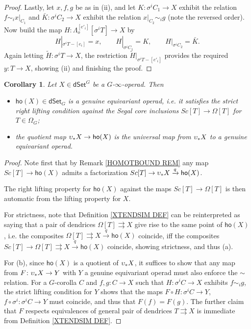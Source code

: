 \documentclass[a4paper,10pt
,draft
]{article}%
\numberwithin{equation}{section}
\numberwithin{figure}{section}
\newtheorem{corollary}[equation]{Corollary}%
\theoremstyle{definition} %
\newcommand{\1}{\ensuremath{\mathbbm 1}}%
\begin{document}
\begin{proof}
Lastly, let $x,f,g$ be as in (ii), 
and let
$K \colon \sigma^i C_1 \to X$ exhibit the relation
$f \sim_i x|_{C_1}$
and 
$ \bar{K} \colon \sigma^i C_2 \to X$
exhibit the relation
$x|_{C_2} \sim_i g$ (note the reversed order).
Now build the map
$H \colon \Lambda_o^{[e'_i]}[\sigma^i T] \to X$ by
\[
	H|_{\sigma^i T - [e_i]} = x,
\qquad
	H|_{\sigma^i C_1} = K,
\qquad
	H|_{\sigma^i C_2} = \bar{K}.
\]
Again letting 
$\widetilde{H} \colon \sigma^i T \to X$,
the restriction 
$\widetilde{H}|_{\sigma^i T - [e'_i]}$
provides the required $y \colon T \to X$,
showing (ii) and finishing the proof.
\end{proof}


\begin{corollary}\label{HOOPUNIV COR}
Let $X \in \mathsf{dSet}^G$ be a $G$-$\infty$-operad. Then
	\begin{itemize}
	\item[(a)] $\mathsf{ho}(X)\in \mathsf{dSet}_G$ is a genuine equivariant operad, i.e. it satisfies the strict right lifting condition against the Segal core inclusions
	$Sc[T] \to \Omega[T]$ for $T \in \Omega_G$;
	\item[(b)] the quotient map
	$\upsilon_{\**}X \to \mathsf{ho}(X)$ is the universal map from $\upsilon_{\**}X$ to a genuine equivariant operad.
	\end{itemize}
\end{corollary}

\begin{proof}
	Note first that by Remark \ref{HOMOTBOUND REM}
	any map 	$Sc[T] \to \mathsf{ho}(X)$ admits a factorization 
	$Sc[T] \to \upsilon_{\**}X \xrightarrow{q} \mathsf{ho}(X)$.
	
	The right lifting property for $\mathsf{ho}(X)$
	against the maps $Sc[T] \to \Omega[T]$
	is then automatic from the lifting property for $X$.

	For strictness,	
	note that Definition \ref{XTENDSIM DEF}
	can be reinterpreted as saying that
	a pair of dendrices $\Omega[T] \rightrightarrows X$
	give rise to the same point of 
	$\mathsf{ho}(X)$, i.e. 
	the composites 
	$\Omega[T] \rightrightarrows X \xrightarrow{q}
	\mathsf{ho}(X)$ coincide, 
	iff the composites 
	$Sc[T] \to \Omega[T] \rightrightarrows X \xrightarrow{q}
	\mathsf{ho}(X)$ coincide, showing strictness, and thus (a).
		
	For (b), since $\mathsf{ho}(X)$ is a quotient of
	$\upsilon_{\**} X$, it suffices to show that any map
	from $F \colon \upsilon_{\**}X \to Y$ with $Y$ a genuine equivariant operad must also enforce the $\sim$ relation.
	For a $G$-corolla $C$ and
	$f,g\colon C \to X$ such that 
	$H \colon \sigma^i C \to X$ exhibits
	$f \sim_i g$, 
	the strict lifting condition for $Y$
	shows that the maps
	$F\circ H \colon \sigma^i C \to Y$,
	$f \circ \sigma^i \colon \sigma^i C \to Y$
	must coincide, and thus that
	$F(f)=F(g)$.
	The further claim that $F$ respects equivalences
	of general pair of dendrices $T \rightrightarrows X$
	is immediate from Definition \ref{XTENDSIM DEF}.
\end{proof}
\end{document}
